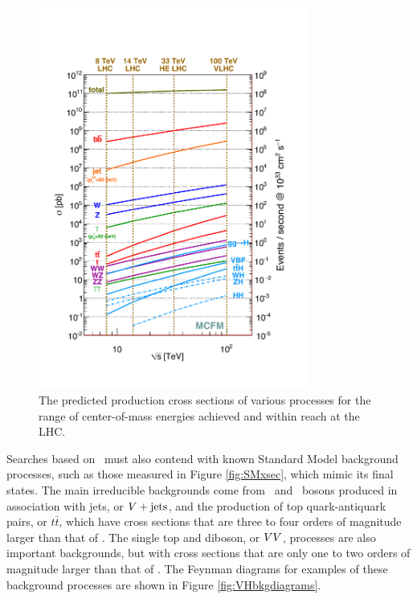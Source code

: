 \begin{figure}[htbp]
  \centering
    \includegraphics[width=3.5in]{images/mcfm-Edep}
    \caption[Production Cross Sections at the LHC]{The predicted production cross sections of various processes for the range of center-of-mass energies achieved and within reach at the LHC.\cite{MCFM}}
    \label{fig:MCFM}
\end{figure}

Searches based on \VHbb\ must also contend with known Standard Model background processes, such as those measured in Figure \ref{fig:SMxsec},  which mimic its final states. The main irreducible backgrounds come from \bosW\ and \bosZ\ bosons produced in association with jets, or $V+\textrm{jets}$, and the production of top quark-antiquark pairs, or $t\bar{t}$, which have cross sections that are three to four orders of magnitude larger than that of \VHbb. The single top and diboson, or $VV$, processes are also important backgrounds, but with cross sections that are only one to two orders of magnitude larger than that of \VHbb. The Feynman diagrams for examples of these background processes are shown in Figure \ref{fig:VHbkgdiagrams}.

